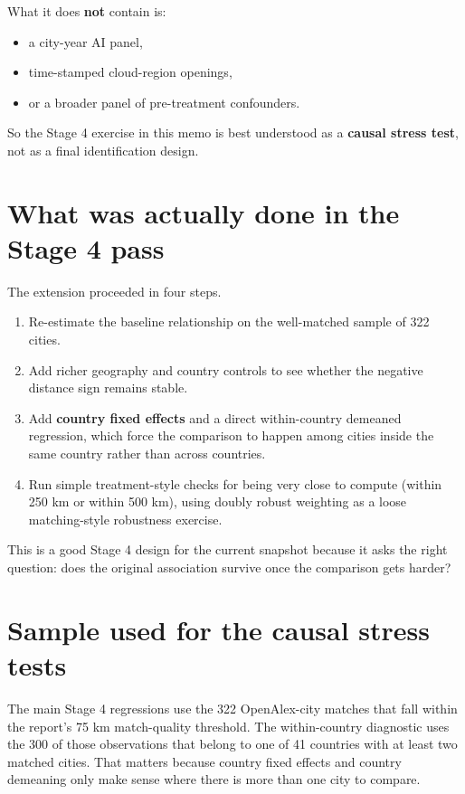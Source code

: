 \documentclass[11pt]{article}
\begin{document}
What it does \textbf{not} contain is:
\begin{itemize}[leftmargin=*]
    \item a city-year AI panel,
    \item time-stamped cloud-region openings,
    \item or a broader panel of pre-treatment confounders.
\end{itemize}

So the Stage 4 exercise in this memo is best understood as a \textbf{causal stress test}, not as a final identification design.

\section{What was actually done in the Stage 4 pass}
The extension proceeded in four steps.
\begin{enumerate}[leftmargin=*]
    \item Re-estimate the baseline relationship on the well-matched sample of 322 cities.
    \item Add richer geography and country controls to see whether the negative distance sign remains stable.
    \item Add \textbf{country fixed effects} and a direct within-country demeaned regression, which force the comparison to happen among cities inside the same country rather than across countries.
    \item Run simple treatment-style checks for being very close to compute (within 250 km or within 500 km), using doubly robust weighting as a loose matching-style robustness exercise.
\end{enumerate}

This is a good Stage 4 design for the current snapshot because it asks the right question: does the original association survive once the comparison gets harder?

\section{Sample used for the causal stress tests}
The main Stage 4 regressions use the 322 OpenAlex-city matches that fall within the report's 75 km match-quality threshold. The within-country diagnostic uses the 300 of those observations that belong to one of 41 countries with at least two matched cities. That matters because country fixed effects and country demeaning only make sense where there is more than one city to compare.
\end{document}
